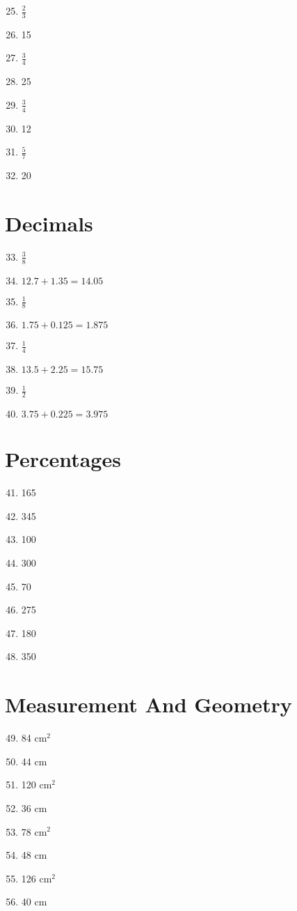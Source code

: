 \documentclass[10pt,a4paper]{article}
\begin{document}
\begin{enumerate}
\setcounter{enumi}{24}
\item $\frac{2}{3}$
\item 15
\item $\frac{3}{4}$
\item 25
\item $\frac{3}{4}$
\item 12
\item $\frac{5}{7}$
\item 20
\end{enumerate}

\section*{Decimals}

\begin{enumerate}
\setcounter{enumi}{32}
\item $\frac{3}{8}$
\item $12.7 + 1.35 = 14.05$
\item $\frac{1}{8}$
\item $1.75 + 0.125 = 1.875$
\item $\frac{1}{4}$
\item $13.5 + 2.25 = 15.75$
\item $\frac{1}{2}$
\item $3.75 + 0.225 = 3.975$
\end{enumerate}

\section*{Percentages}

\begin{enumerate}
\setcounter{enumi}{40}
\item 165
\item 345
\item 100
\item 300
\item 70
\item 275
\item 180
\item 350
\end{enumerate}

\section*{Measurement And Geometry}

\begin{enumerate}
\setcounter{enumi}{48}
\item 84 $\text{cm}^{2}$
\item 44 cm
\item 120 $\text{cm}^{2}$
\item 36 cm
\item 78 $\text{cm}^{2}$
\item 48 cm
\item 126 $\text{cm}^{2}$
\item 40 cm
\end{enumerate}
\end{document}
